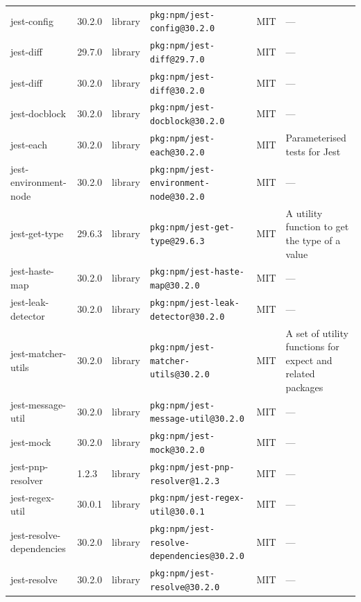 \documentclass[11pt,a4paper]{article}
\begin{document}
\begin{longtable}{|p{4cm}|p{2cm}|p{1.6cm}|p{5cm}|p{1.5cm}|p{3.5cm}|}
\raggedright jest-config & 30.2.0 & library & \small\texttt{pkg:npm/jest-config@30.2.0} & MIT & \small — \\
\raggedright jest-diff & 29.7.0 & library & \small\texttt{pkg:npm/jest-diff@29.7.0} & MIT & \small — \\
\raggedright jest-diff & 30.2.0 & library & \small\texttt{pkg:npm/jest-diff@30.2.0} & MIT & \small — \\
\raggedright jest-docblock & 30.2.0 & library & \small\texttt{pkg:npm/jest-docblock@30.2.0} & MIT & \small — \\
\raggedright jest-each & 30.2.0 & library & \small\texttt{pkg:npm/jest-each@30.2.0} & MIT & \small Parameterised tests for Jest \\
\raggedright jest-environment-node & 30.2.0 & library & \small\texttt{pkg:npm/jest-environment-node@30.2.0} & MIT & \small — \\
\raggedright jest-get-type & 29.6.3 & library & \small\texttt{pkg:npm/jest-get-type@29.6.3} & MIT & \small A utility function to get the type of a value \\
\raggedright jest-haste-map & 30.2.0 & library & \small\texttt{pkg:npm/jest-haste-map@30.2.0} & MIT & \small — \\
\raggedright jest-leak-detector & 30.2.0 & library & \small\texttt{pkg:npm/jest-leak-detector@30.2.0} & MIT & \small — \\
\raggedright jest-matcher-utils & 30.2.0 & library & \small\texttt{pkg:npm/jest-matcher-utils@30.2.0} & MIT & \small A set of utility functions for expect and related packages \\
\raggedright jest-message-util & 30.2.0 & library & \small\texttt{pkg:npm/jest-message-util@30.2.0} & MIT & \small — \\
\raggedright jest-mock & 30.2.0 & library & \small\texttt{pkg:npm/jest-mock@30.2.0} & MIT & \small — \\
\raggedright jest-pnp-resolver & 1.2.3 & library & \small\texttt{pkg:npm/jest-pnp-resolver@1.2.3} & MIT & \small — \\
\raggedright jest-regex-util & 30.0.1 & library & \small\texttt{pkg:npm/jest-regex-util@30.0.1} & MIT & \small — \\
\raggedright jest-resolve-dependencies & 30.2.0 & library & \small\texttt{pkg:npm/jest-resolve-dependencies@30.2.0} & MIT & \small — \\
\raggedright jest-resolve & 30.2.0 & library & \small\texttt{pkg:npm/jest-resolve@30.2.0} & MIT & \small — \\

\end{longtable}
\end{document}
